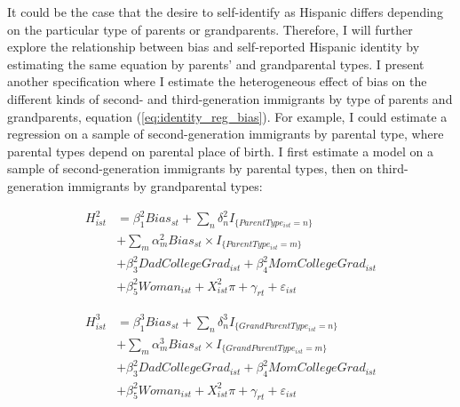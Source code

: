 \documentclass[12pt, fullpage]{article}
\begin{document}
It could be the case that the desire to self-identify as Hispanic differs depending on the particular type of parents or grandparents. Therefore, I will further explore the relationship between bias and self-reported Hispanic identity by estimating the same equation by parents' and grandparental types. I present another specification where I estimate the heterogeneous effect of bias on the different kinds of second- and third-generation immigrants by type of parents and grandparents, equation (\ref{eq:identity_reg_bias}). For example, I could estimate a regression on a sample of second-generation immigrants by parental type, where parental types depend on parental place of birth. I first estimate a model on a sample of second-generation immigrants by parental types, then on third-generation immigrants by grandparental types: 

\begin{align}
H_{ist}^2 &= \beta_1^2 Bias_{st} + \sum_{n}\delta_n^2 I_{\{ParentType_{ist} = n\}}  \label{eq:identity_reg_bias_interaction_2} \\
&+\sum_{m} \alpha_m^2 Bias_{st} \times I_{\{ParentType_{ist} = m\}} \nonumber \\
&+ \beta_3^2 DadCollegeGrad_{ist} + \beta_4^2 MomCollegeGrad_{ist} \nonumber \\ 
&+ \beta_5^2 Woman_{ist} + X_{ist}^2\pi + \gamma_{rt} + \varepsilon_{ist} \nonumber
\end{align}

\begin{align}
H_{ist}^3 &= \beta_1^3 Bias_{st} + \sum_{n}\delta_n^3 I_{\{GrandParentType_{ist} = n\}}  \label{eq:identity_reg_bias_interaction_3} \\
&+\sum_{m} \alpha_m^3  Bias_{st} \times I_{\{GrandParentType_{ist} = m\}} \nonumber \\
&+ \beta_3^2 DadCollegeGrad_{ist} + \beta_4^2 MomCollegeGrad_{ist} \nonumber \\ 
&+ \beta_5^2 Woman_{ist} + X_{ist}^2\pi + \gamma_{rt} + \varepsilon_{ist} \nonumber
\end{align}
\end{document}
